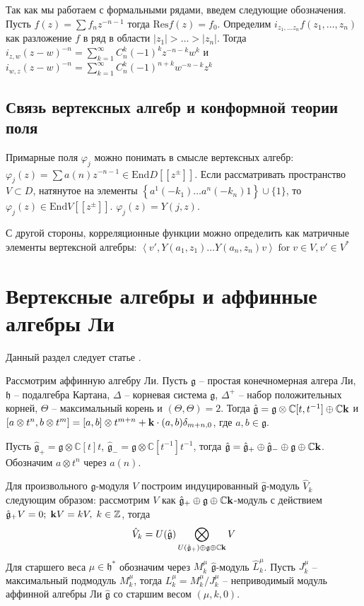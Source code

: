 \documentclass[12pt]{article}
\newcommand{\gf}{\mathfrak{g}}
\newcommand{\hf}{\mathfrak{h}}
\newcommand{\gfh}{\hat{\mathfrak{g}}}
\begin{document}
Так как мы работаем с формальными рядами, введем следующие обозначения.
Пусть $f(z)=\sum f_n z^{-n-1}$ тогда $\mathrm{Res} f(z)= f_0$. Определим $i_{z_1,\dots z_n}
f(z_1,\dots,z_n)$ как разложение $f$ в ряд в области $|z_1|>\dots>|z_n|$. 
Тогда $i_{z,w}(z-w)^{-n} = \sum_{k=1}^{\infty} C_n^k (-1)^k z^{-n-k} w^k$ и $i_{w,z}(z-w)^{-n} = \sum_{k=1}^{\infty} C_n^k (-1)^{n+k} w^{-n-k} z^{k} $ 

\subsection{Связь вертексных алгебр и конформной теории поля}
 Примарные поля
$\varphi_j$ можно понимать в смысле вертексных алгебр: $\varphi_j (z)
=  \sum a(n) z^{-n-1} \in \mathrm{End} D [[z^{\pm}]]$. Если
рассматривать пространство $V\subset D$, натянутое на элементы $\left\{a^1
(-k_1) \dots a^n (-k_n) 1 \right\} \cup \{1\}$, то $\varphi_j (z) \in
\mathrm{End} V [[z^{\pm}]]$. 
$\varphi_j (z) = Y(j,z)$.

С другой стороны, корреляционные функции можно определить как
матричные элементы вертексной алгебры: $\left<v',Y(a_1,z_1)\dots
  Y(a_n,z_n) v\right> \;\mbox{for}\; v\in V, v'\in V^*$

\section{Вертексные алгебры и аффинные алгебры Ли}
\label{sec:affine-lie-algebras}
Данный раздел следует статье \cite{frenkel1992vertex}.

Рассмотрим аффинную алгебру Ли. Пусть $\gf$ -- простая конечномерная
алгера Ли, $\hf$ -- подалгебра Картана, $\Delta$ -- корневая система
$\gf$, $\Delta^+$ -- набор положительных корней, $\Theta$ --
максимальный корень и $(\Theta,\Theta)=2$. 
Тогда $\gfh=\gf\otimes \mathbb{C} [t,t^{-1}]\oplus \mathbb{C}{\bf k}$
и $[a\otimes t^n, b\otimes t^m]=[a,b]\otimes t^{m+n} +{\bf k}\cdot
(a,b)\delta_{m+n,0}$, где $a,b\in \gf$. 

Пусть $\gfh_+=\gf\otimes \mathbb{C}[t]t$, $\gfh_- =\gf\otimes
\mathbb{C}[t^{-1}]t^{-1}$, тогда $\gfh=\gfh_+\oplus \gfh_- \oplus \gf\oplus
\mathbb{C}{\bf k}$. 
Обозначим $a\otimes t^n$ через $a(n)$.

Для произвольного $\gf$-модуля $V$ построим индуцированный $\gfh$-модуль $\hat{V}_k$ следующим
образом: рассмотрим $V$ как $\gfh_+ \oplus\gf\oplus \mathbb{C}{\bf k}$-модуль с
действием $\gfh_+ V=0; \; {\bf k} V=k V,\; k\in \mathbb{Z}$, тогда
\begin{equation}
  \label{eq:1}
  \hat{V}_k=U(\gfh) \bigotimes_{U(\gfh_+)\oplus \gf\oplus\mathbb{C}{\bf k}} V
\end{equation}
Для старшего веса $\mu\in \hf^* $ обозначим через $M^{\mu}_{k}$ $\gfh$-модуль
$\hat{L}^{\mu}_k$. Пусть $J^{\mu}_k$ -- максимальный подмодуль $M^{\mu}_k$,
тогда $L^{\mu}_k=M^{\mu}_k/J^{\mu}_k$ -- неприводимый модуль аффинной алгебры Ли
$\gfh$ со старшим весом $(\mu,k,0)$.
\end{document}
